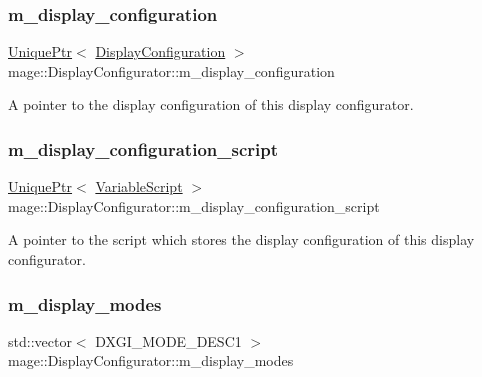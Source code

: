 \subsubsection{\texorpdfstring{m\+\_\+display\+\_\+configuration}{m\_display\_configuration}}
{\footnotesize\ttfamily \hyperlink{namespacemage_a3316d7143a973e37adf1110f2e80ca31}{Unique\+Ptr}$<$ \hyperlink{structmage_1_1_display_configuration}{Display\+Configuration} $>$ mage\+::\+Display\+Configurator\+::m\+\_\+display\+\_\+configuration\hspace{0.3cm}{\ttfamily [private]}}

A pointer to the display configuration of this display configurator. \hypertarget{classmage_1_1_display_configurator_ab4030a5fe67b8253113799f42a0868c0}{}\label{classmage_1_1_display_configurator_ab4030a5fe67b8253113799f42a0868c0} 
\subsubsection{\texorpdfstring{m\+\_\+display\+\_\+configuration\+\_\+script}{m\_display\_configuration\_script}}
{\footnotesize\ttfamily \hyperlink{namespacemage_a3316d7143a973e37adf1110f2e80ca31}{Unique\+Ptr}$<$ \hyperlink{classmage_1_1_variable_script}{Variable\+Script} $>$ mage\+::\+Display\+Configurator\+::m\+\_\+display\+\_\+configuration\+\_\+script\hspace{0.3cm}{\ttfamily [private]}}

A pointer to the script which stores the display configuration of this display configurator. \hypertarget{classmage_1_1_display_configurator_a181938d55d2c57d695c26451054a7c9d}{}\label{classmage_1_1_display_configurator_a181938d55d2c57d695c26451054a7c9d} 
\subsubsection{\texorpdfstring{m\+\_\+display\+\_\+modes}{m\_display\_modes}}
{\footnotesize\ttfamily std\+::vector$<$ D\+X\+G\+I\+\_\+\+M\+O\+D\+E\+\_\+\+D\+E\+S\+C1 $>$ mage\+::\+Display\+Configurator\+::m\+\_\+display\+\_\+modes\hspace{0.3cm}{\ttfamily [private]}}

